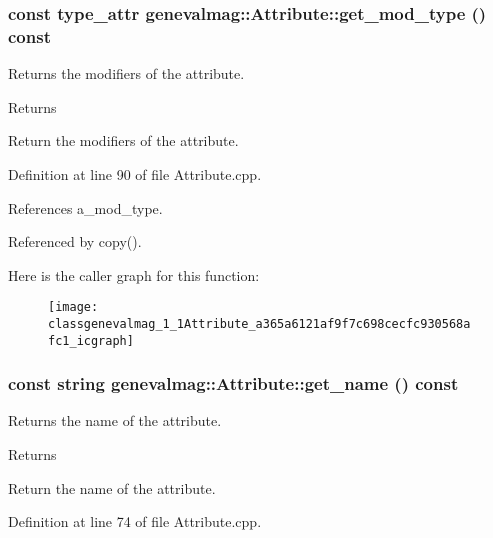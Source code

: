\hypertarget{classgenevalmag_1_1Attribute_a365a6121af9f7c698cecfc930568afc1}{
\subsubsection[{get\_\-mod\_\-type}]{\setlength{\rightskip}{0pt plus 5cm}const {\bf type\_\-attr} genevalmag::Attribute::get\_\-mod\_\-type () const}}
\label{classgenevalmag_1_1Attribute_a365a6121af9f7c698cecfc930568afc1}
Returns the modifiers of the attribute. \begin{DoxyReturn}{Returns}

\end{DoxyReturn}
Return the modifiers of the attribute. 

Definition at line 90 of file Attribute.cpp.



References a\_\-mod\_\-type.



Referenced by copy().



Here is the caller graph for this function:\nopagebreak
\begin{figure}[H]
\begin{center}
\leavevmode
\texttt{[image: classgenevalmag\_1\_1Attribute\_a365a6121af9f7c698cecfc930568afc1\_icgraph]}
\end{center}
\end{figure}


\hypertarget{classgenevalmag_1_1Attribute_ac44b53232e4656b7e734bcbb942bddfe}{
\subsubsection[{get\_\-name}]{\setlength{\rightskip}{0pt plus 5cm}const string genevalmag::Attribute::get\_\-name () const}}
\label{classgenevalmag_1_1Attribute_ac44b53232e4656b7e734bcbb942bddfe}
Returns the name of the attribute. \begin{DoxyReturn}{Returns}

\end{DoxyReturn}
Return the name of the attribute. 

Definition at line 74 of file Attribute.cpp.



